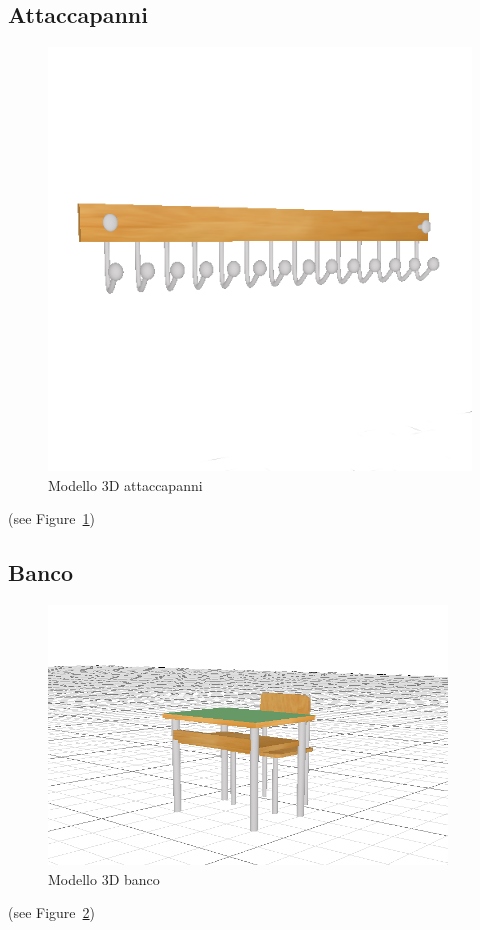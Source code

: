 \subsection*{Attaccapanni}
\begin{figure}[htbp] %
   \centering
   \includegraphics[width=0.5\linewidth]{images/attaccapanni2}
   \caption{Modello 3D attaccapanni}
   \label{fig:attaccapanni}
   \end{figure}
   (see Figure~\ref{fig:attaccapanni})
   \newpage

\subsection*{Banco}
\begin{figure}[htbp] %
   \centering
   \includegraphics[width=0.5\linewidth]{images/banco2}
   \caption{Modello 3D banco}
   \label{fig:banco}
   \end{figure}
   (see Figure~\ref{fig:banco})
   \newpage

